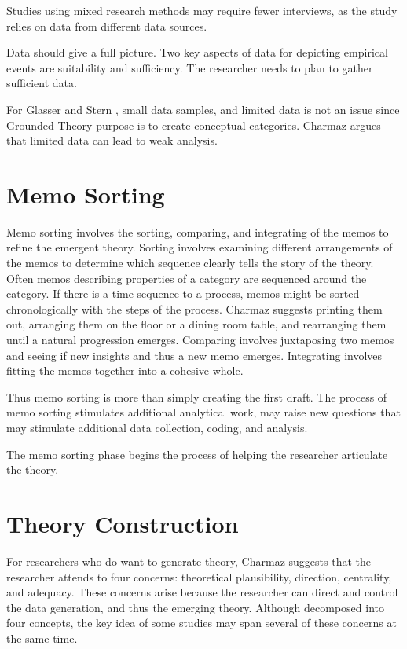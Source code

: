 Studies using mixed research methods may require fewer interviews, as the study relies on data from different data sources.

Data should give a full picture. Two key aspects of data for depicting empirical events are suitability and sufficiency.  The researcher needs to plan to gather sufficient data. 

For Glasser \cite{GlaserIssues} and Stern \cite{SternErodingGroundedTheory}, small data samples, and limited data is not an issue since Grounded Theory purpose is to create conceptual categories. Charmaz argues that limited data can lead to weak analysis. 
\section{Memo Sorting}
Memo sorting involves the sorting, comparing, and integrating of the memos to refine the emergent theory. Sorting involves examining different arrangements of the memos to determine which sequence clearly tells the story of the theory. Often memos describing properties of a category are sequenced around the category. If there is a time sequence to a process, memos might be sorted chronologically with the steps of the process. Charmaz suggests printing them out, arranging them on the floor or a dining room table, and rearranging them until a natural progression emerges. Comparing involves juxtaposing two memos and seeing if new insights and thus a new memo emerges. Integrating involves fitting the memos together into a cohesive whole. 

Thus memo sorting is more than simply creating the first draft. The process of memo sorting stimulates additional analytical work, may raise new questions that may stimulate additional data collection, coding, and analysis. 

The memo sorting phase begins the process of helping the researcher articulate the theory.

\section{Theory Construction}
For researchers who do want to generate theory, Charmaz suggests that the researcher attends to four concerns: theoretical plausibility, direction, centrality, and adequacy. These concerns arise because the researcher can direct and control the data generation, and thus the emerging theory. Although decomposed into four concepts, the key idea of some studies may span several of these concerns at the same time.

